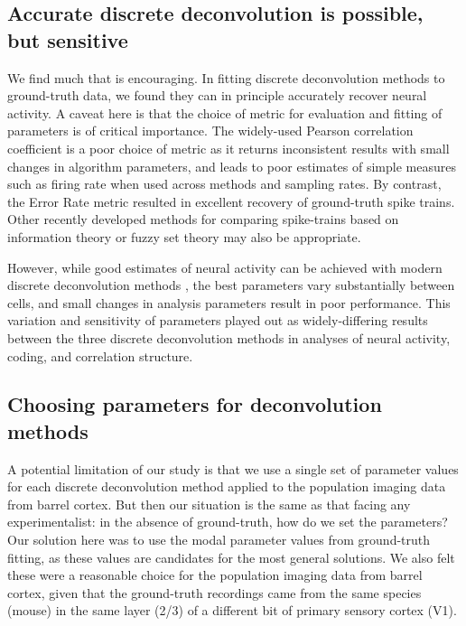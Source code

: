 \documentclass[a4paper,11pt]{article}
\begin{document}
\subsection{Accurate discrete deconvolution is possible, but sensitive}
We find much that is encouraging. In fitting discrete deconvolution methods to ground-truth data, we found they can in principle accurately recover neural activity. A caveat here is that the choice of metric for evaluation and fitting of parameters is of critical importance. The widely-used Pearson correlation coefficient is a poor choice of metric as it returns inconsistent results with small changes in algorithm parameters, and leads to poor estimates of simple measures such as firing rate when used across methods and sampling rates. By contrast, the Error Rate metric \citep{Deneux2016-gu, Victor1996-cg} resulted in excellent recovery of ground-truth spike trains. Other recently developed methods for comparing spike-trains based on information theory \citep{Theis2016-ee} or fuzzy set theory \citep{Reynolds2018-yh} may also be appropriate. 

However, while good estimates of neural activity can be achieved with modern discrete deconvolution methods \citep{Berens2018-su, Pachitariu2018-cj}, the best parameters vary substantially between cells, and small changes in analysis parameters result in poor performance. This variation and sensitivity of parameters played out as widely-differing results between the three discrete deconvolution methods in analyses of neural activity, coding, and correlation structure.

\subsection{Choosing parameters for deconvolution methods} 
A potential limitation of our study is that we use a single set of parameter values for each discrete deconvolution method applied to the population imaging data from barrel cortex. But then our situation is the same as that facing any experimentalist: in the absence of ground-truth, how do we set the parameters? Our solution here was to use the modal parameter values from ground-truth fitting, as these values are candidates for the most general solutions. We also felt these were a reasonable choice for the population imaging data from barrel cortex, given that the ground-truth recordings came from the same species (mouse) in the same layer (2/3) of a different bit of primary sensory cortex (V1). 
\end{document}
